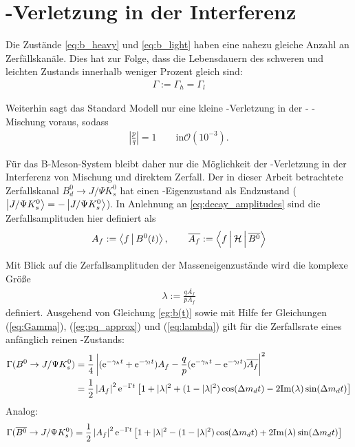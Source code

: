 \section{\CP-Verletzung in der Interferenz}
Die Zustände \ref{eq:b_heavy} und \ref{eq:b_light} haben eine nahezu gleiche Anzahl an Zerfällskanäle. Dies hat zur Folge, dass die Lebensdauern des schweren und leichten Zustands innerhalb weniger Prozent gleich sind:
\begin{align}
\Gamma := \Gamma_h = \Gamma_l \label{eq:Gamma}
\end{align}

Weiterhin sagt das Standard Modell nur eine kleine \CP-Verletzung in der \Bd - \Bdbar - Mischung voraus, sodass
\begin{align}
\left|\frac{p}{q}\right| = 1 \qquad \text{in} \mathcal{O}(10^{-3}). \label{eg:pq_approx}
\end{align}

Für das B-Meson-System bleibt daher nur die Möglichkeit der \CP-Verletzung in der Interferenz von Mischung und direktem Zerfall. Der in dieser Arbeit betrachtete Zerfallskanal $B_d^0 \rightarrow J/\Psi K_s^0$ hat einen \CP-Eigenzustand als Endzustand (\CP $\Ket{J/\Psi K_s^0} = -\Ket{J/\Psi K_s^0}$). In Anlehnung an \ref{eq:decay_amplitudes} sind die Zerfallsamplituden hier definiert als
\begin{align}
\nonumber A_f := \Braket{f|B^0(t)}, \qquad \overline{A_{f}} := \Braket{f|\mathcal{H}|\overline{B^0}}
\end{align}

Mit Blick auf die Zerfallsamplituden der Masseneigenzustände wird die komplexe Größe
\begin{align}
\lambda := \frac{q\overline{A_f}}{pA_f} \label{eq:lambda}
\end{align}
definiert. Ausgehend von Gleichung \ref{eg:b(t)} sowie mit Hilfe fer Gleichungen (\ref{eq:Gamma}), (\ref{eg:pq_approx}) und (\ref{eq:lambda}) gilt für die Zerfallsrate eines anfänglich reinen \Bd-Zustands:
\begin{align}
\nonumber \Gamma (B^0 \rightarrow J/\Psi K_s^0) &= \frac{1}{4}\left| (\mathrm{e}^{-\gamma_h t}+\mathrm{e}^{-\gamma_l t})A_f - \frac{q}{p}(\mathrm{e}^{-\gamma_h t}-\mathrm{e}^{-\gamma_l t})\overline{A_f}\right|^2 \\
&= \frac{1}{2} \left|A_f\right|^2\mathrm{e}^{-\Gamma t} \left[1+|\lambda|^2 + (1-|\lambda|^2)\cos(\Delta m_d t) - 2\mathrm{Im}(\lambda)\sin(\Delta m_d t)\right]
\end{align}
Analog:
\begin{align}
\Gamma (\overline{B^0} \rightarrow J/\Psi K_s^0) &= \frac{1}{2} \left|A_f\right|^2\mathrm{e}^{-\Gamma t} \left[1+|\lambda|^2 -(1-|\lambda|^2)\cos(\Delta m_d t) + 2\mathrm{Im}(\lambda)\sin(\Delta m_d t)\right]
\end{align}

